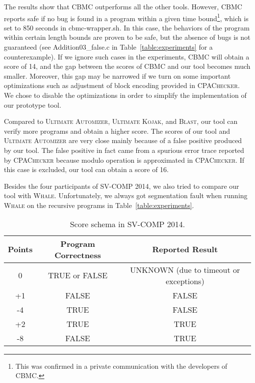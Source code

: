 The results show that CBMC outperforms all the other tools.
However, CBMC reports safe if no bug is found in a program within a
given time bound\footnote{This was confirmed in a private
  communication with the developers of CBMC.}, which is set to 850
seconds in cbmc-wrapper.sh.
In this case, the behaviors of the program within certain length
bounds are proven to be safe, but the absence of bugs is not
guaranteed (see Addition03\_false.c in Table~\ref{table:experiments} for
a counterexample).
If we ignore such cases in the experiments, CBMC will obtain a score
of 14, and the gap between the scores of CBMC and our tool becomes
much smaller.
Moreover, this gap may be narrowed if we turn on some important
optimizations such as adjustment of block encoding provided in
\textsc{CPAChecker}.
We chose to disable the optimizations in order to simplify the
implementation of our prototype tool.

Compared to \textsc{Ultimate Automizer}, \textsc{Ultimate Kojak}, and \textsc{Blast},
our tool can verify more programs and obtain a higher score.
The scores of our tool and \textsc{Ultimate Automizer} are very close mainly
because of a false positive produced by our tool.
The false positive in fact came from a spurious error trace reported
by \textsc{CPAChecker} because modulo operation is approximated in
\textsc{CPAChecker}.
If this case is excluded, our tool can obtain a score of 16.

Besides the four participants of SV-COMP 2014, we also tried to
compare our tool with \textsc{Whale}.
Unfortunately, we always got segmentation fault when running
\textsc{Whale} on the recursive programs in
Table~\ref{table:experiments}.




\begin{table}
\caption{Score schema in SV-COMP 2014.\label{table:score-schema}}
\begin{center}
\begin{tabular}{|c|c|c|}
\hline
Points & Program Correctness & Reported Result \\\hline
0      & TRUE or FALSE & UNKNOWN (due to timeout or exceptions) \\
+1     & FALSE         & FALSE \\
-4     & TRUE          & FALSE \\
+2     & TRUE          & TRUE \\
-8     & FALSE         & TRUE \\\hline
\end{tabular}
\end{center}
\end{table}

